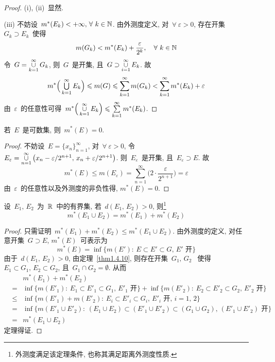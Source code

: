 \begin{proof}
(i), (ii)~显然.

(iii) 不妨设~$m^*(E_k) < +\infty, \, \forall~k \in \mathbb{N}$. 由外测度定义,
对~$\forall~\varepsilon > 0$, 存在开集~$G_k \supset E_k$~使得
\[
m(G_k) < m^*(E_k) + \frac{\varepsilon}{2^k}, \quad \forall~k \in \mathbb{N}
\]
令~$G = \mathop{\cup}\limits_{k=1}^\infty G_k$, 则~$G$~是开集, 且~$G \supset
\mathop{\cup}\limits_{i=1}^\infty E_k$. 故
\[
m^*\Big(\mathop{\textstyle{\bigcup}}^\infty_{k=1} E_k\Big) \leqslant m(G) \leqslant \sum^\infty_{k=1}m(G_k)
< \sum^\infty_{k=1} m^*(E_k) + \varepsilon
\]
由~$\varepsilon$~的任意性可得~$m^*\Big( \mathop{\cup}\limits_{k=1}^\infty E_k \Big) \leqslant
\sum\limits_{k=1}^\infty m^*(E_k)$.
\end{proof}

\medskip

\begin{example} \label{ex231}
若~$E$~是可数集, 则~$m^*(E) = 0$.
\end{example}

\medskip

\begin{proof}
不妨设~$E = \{x_n\}^\infty_{n=1}$, 对~$\forall~\varepsilon > 0$, 令
~$E_\varepsilon = \mathop{\cup}\limits_{n=1}^\infty \big(x_n-\varepsilon/2^{n+1},\,x_n+\varepsilon/2^{n+1}\big)$.
则~$E_\varepsilon$~是开集, 且~$E_\varepsilon \supset E$. 故
\[
m^*(E) \leqslant m(E_\varepsilon) = \sum_{n=1}^\infty \Big(2 \cdot
\frac{\varepsilon}{2^{n+1}} \Big) = \varepsilon
\]
由~$\varepsilon$~的任意性以及外测度的非负性得, $m^*(E) = 0$.
\end{proof}

\begin{theorem}
设~$E_1,\,E_2$~为~$\mathbb{R}$~中的有界集, 若~$d(E_1,\,E_2) > 0$, 则\footnote{外测度满足该定理条件, 也称其满足距离外测度性质. }
\[
m^*(E_1 \cup E_2) = m^*(E_1) + m^*(E_2)
\]
\end{theorem}

\begin{proof}
只需证明~$m^*(E_1) + m^*(E_2) \leqslant m^*(E_1 \cup E_2)$. 由外测度的定义,
对任意开集~$G \supset E$, $m^*(E)$~可表示为
\[
m^*(E) = \inf\{m(E'): \: E \subset E' \subset G, \, E' \mbox{~开}\}
\]
由于~$d(E_1,\,E_2)>0$, 由定理~\ref{thm1.4.10}, 则存在开集~$G_1,\,G_2$~
使得~$E_1 \subset G_1,\,
E_2\subset G_2$, 且~$G_1 \cap G_2 = \emptyset$. 从而
\begin{eqnarray*}
&& m^*(E_1)+m^*(E_2) \\
&=& \inf\big\{m(E'_1):\:E_1 \subset E'_1 \subset G_1,\, E'_1 \mbox{~开}\big\} + \inf\big\{m(E'_2):\:E_2 \subset E'_2 \subset G_2,\, E'_2 \mbox{~开}\big\} \\
&\leqslant& \inf\big\{m(E'_1)+m(E'_2):\:E_i \subset E'_i \subset G_i,\, E'_i \mbox{~开},
\,i=1,\,2\big\} \\
&=& \inf\big\{m(E'_1 \cup E'_2): \: (E_1 \cup E_2) \subset (E'_1 \cup E'_2) \subset
(G_1 \cup G_2),\,(E'_1 \cup E'_2) \mbox{~开}\big\} \\
&=& m^*(E_1 \cup E_2)
\end{eqnarray*}
定理得证.
\end{proof}

